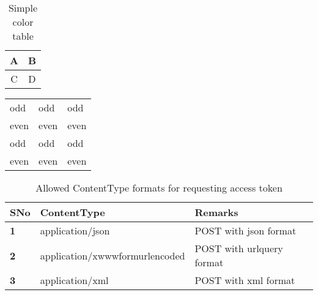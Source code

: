 \documentclass{article}
\begin{document}
\begin{table}[ht!]
    \centering
    \caption{Simple color table}
    \begin{tabular}{|c|c|}
        \hline
        \cellcolor{purple!30}A & \cellcolor{pink!60}B \\
        \hline
        \cellcolor{red!40}C & \cellcolor{orange!50}D \\
        \hline
    \end{tabular}
\end{table}


\begin{table}[h]
\end{table}
\medskip

\begin{center}

\begin{tabularx}{\textwidth}{lll}
odd 	& odd 	& odd \\
even 	& even 	& even\\
odd 	& odd 	& odd \\
even 	& even 	& even\\
\end{tabularx}
\end{center}
\medskip


\begin{table}[ht]
  \centering
  \caption{Allowed Content\-Type formats for requesting access token}
  \label{table:content-types}
  \begin{adjustbox}{width=1\linewidth}
    \small
    \begin{tabularx}{\linewidth}{lll}
      \toprule
      \textcolor{mulberry}{\textbf{SNo}} & \textcolor{mulberry}{\textbf{Content\-Type}} & \textcolor{mulberry}{\textbf{Remarks}}   \\
      \midrule
      \textbf{1} & \textcolor{byzantium}{application/json} & POST with \textsf{json} format \\
      \textbf{2} & \textcolor{bondiblue}{application/x\-www\-form\-urlencoded}  & POST with \textsf{url\-query} format \\
      \textbf{3} & \textcolor{mediumpersianblue}{application/xml}  & POST with \textsf{xml} format \\
      \bottomrule
    \end{tabularx}
  \end{adjustbox}
\end{table}
\medskip
\end{document}
